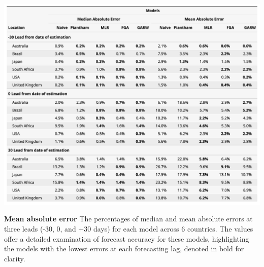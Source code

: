 \documentclass[11pt,oneside,letterpaper]{article}
\begin{document}
\begin{table}[tb!]
	\centering
	\includegraphics[width=1\textwidth]{figures/model_comp_table.png}
	\caption{
		\textbf{Mean absolute error}
		The percentages of median and mean absolute errors at three leads (-30, 0, and +30 days) for each model across 6 countries.
		The values offer a detailed examination of forecast accuracy for these models, highlighting the models with the lowest errors at each forecasting lag, denoted in bold for clarity. 
		}
	
	\label{table:model_comp_table}
\end{table}
\end{document}
